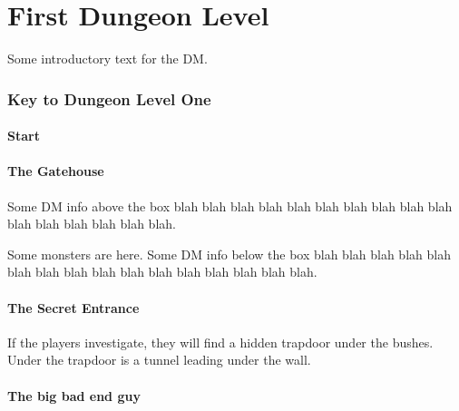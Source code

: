 \documentclass[a4paper,serif]{module}       %
\begin{document}

\part{First Dungeon Level}

Some introductory text for the DM.

\section*{Key to Dungeon Level One}

\subsection*{Start}


\subsection{The Gatehouse}

Some DM info above the box blah blah blah blah blah blah blah blah blah blah blah blah blah blah blah blah.


Some monsters are here.
Some DM info below the box blah blah blah blah blah blah blah blah blah blah blah blah blah blah blah blah.

\subsection{The Secret Entrance}


If the players investigate, they will find a hidden trapdoor under the bushes. Under the trapdoor is a tunnel leading under the wall.

\subsection{The big bad end guy}
\end{document}
